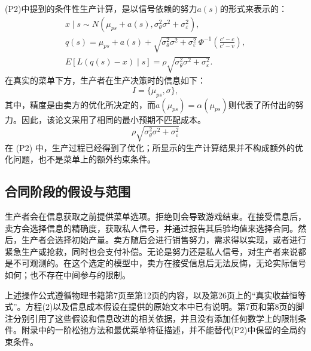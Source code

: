 \documentclass{article}
\begin{document}
(P2)中提到的条件性生产计算，是以信号依赖的努力$a(s)$的形式来表示的：
\begin{gather*}
x\mid s\sim N\!\left(\mu_{ps}+a(s),
\sigma_\theta^2\sigma^2+\sigma_\varepsilon^2\right),\\
q(s)=\mu_{ps}+a(s)
+\sqrt{\sigma_\theta^2\sigma^2+\sigma_\varepsilon^2}
\,\Phi^{-1}\!\left(\frac{c'-c}{c'-v}\right),\\
E[L(q(s)-x)\mid s]
=\rho\sqrt{\sigma_\theta^2\sigma^2+\sigma_\varepsilon^2}.
\end{gather*}
在真实的菜单下方，生产者在生产决策时的信息如下：
\begin{equation*}
I=\{\mu_{ps},\sigma\},
\end{equation*}
其中，精度是由卖方的优化所决定的，而$a(\mu_{ps})=\alpha(\mu_{ps})$则代表了所付出的努力。因此，该论文采用了相同的最小预期不匹配成本。
\begin{equation*}
\rho\sqrt{\sigma_\theta^2\sigma^2+\sigma_\varepsilon^2}
\end{equation*}
在 (P2) 中，生产过程已经得到了优化；所显示的生产计算结果并不构成额外的优化问题，也不是菜单上的额外约束条件。

\subsection*{合同阶段的假设与范围}

生产者会在信息获取之前提供菜单选项。拒绝则会导致游戏结束。在接受信息后，卖方会选择信息的精确度，获取私人信号，并通过报告其后验均值来选择合同。然后，生产者会选择初始产量。卖方随后会进行销售努力，需求得以实现，或者进行紧急生产或抢救，同时也会支付补偿。无论是努力还是私人信号，对生产者来说都是不可观测的。在这个选定的模型中，卖方在接受信息后无法反悔，无论实际信号如何；也不存在中间参与的限制。

上述操作公式遵循物理书籍第7页至第12页的内容，以及第26页上的“真实收益恒等式”。方程(2)以及信息成本假设在提供的原始文本中已有说明。第7页和第8页的脚注分别引用了这些假设和信息改进的相关依据，并且没有添加任何数学上的限制条件。附录中的一阶松弛方法和最优菜单特征描述，并不能替代(P2)中保留的全局约束条件。
\end{document}

